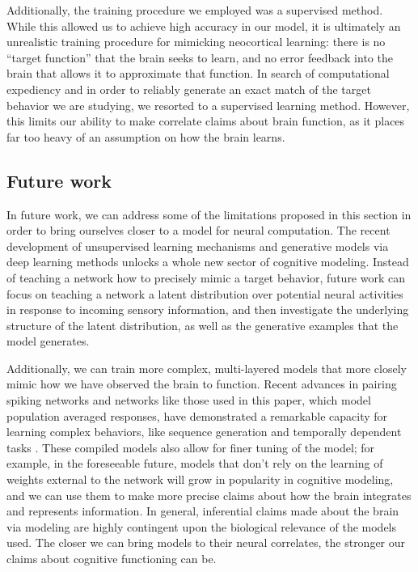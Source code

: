 \documentclass[12pt,a4paper,final]{iopart}
\begin{document}
Additionally, the training procedure we employed was a supervised method. While this allowed us to achieve high accuracy in our model, it is ultimately an unrealistic training procedure for mimicking neocortical learning: there is no ``target function'' that the brain seeks to learn, and no error feedback into the brain that allows it to approximate that function. In search of computational expediency and in order to reliably generate an exact match of the target behavior we are studying, we resorted to a supervised learning method. However, this limits our ability to make correlate claims about brain function, as it places far too heavy of an assumption on how the brain learns. 

\subsection{Future work}
In future work, we can address some of the limitations proposed in this section in order to bring ourselves closer to a model for neural computation. The recent development of unsupervised learning mechanisms and generative models via deep learning methods \cite{SussilloLFADS} unlocks a whole new sector of cognitive modeling. Instead of teaching a network how to precisely mimic a target behavior, future work can focus on teaching a network a latent distribution over potential neural activities in response to incoming sensory information, and then investigate the underlying structure of the latent distribution, as well as the generative examples that the model generates.

Additionally, we can train more complex, multi-layered models that more closely mimic how we have observed the brain to function. Recent advances in pairing spiking networks and networks like those used in this paper, which model population averaged responses, have demonstrated a remarkable capacity for learning complex behaviors, like sequence generation and temporally dependent tasks \cite{SussilloLFADS}. These compiled models also allow for finer tuning of the model; for example, in the foreseeable future, models that don't rely on the learning of weights external to the network will grow in popularity in cognitive modeling, and we can use them to make more precise claims about how the brain integrates and represents information. In general, inferential claims made about the brain via modeling are highly contingent upon the biological relevance of the models used. The closer we can bring models to their neural correlates, the stronger our claims about cognitive functioning can be.
\end{document}
